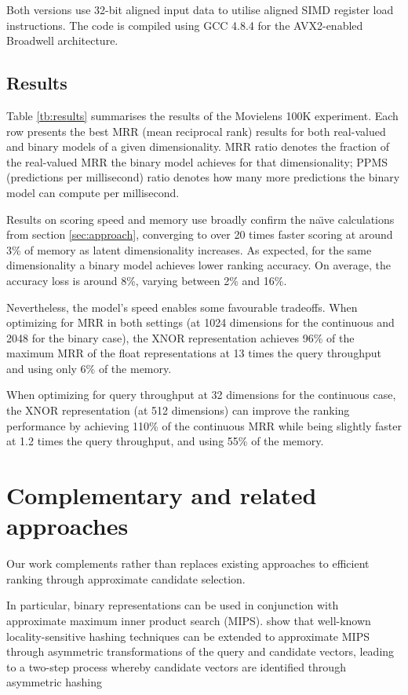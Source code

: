 \documentclass[sigchi]{acmart}
\begin{document}
Both versions use 32-bit aligned input data to utilise aligned SIMD register load instructions. The code is compiled using GCC 4.8.4 for the AVX2-enabled Broadwell architecture.

\subsection{Results}
\label{sec:results}
Table \ref{tb:results} summarises the results of the Movielens 100K experiment. Each row presents the best MRR (mean reciprocal rank) results for both real-valued and binary models of a given dimensionality. MRR ratio denotes the fraction of the real-valued MRR the binary model achieves for that dimensionality; PPMS (predictions per millisecond) ratio denotes how many more predictions the binary model can compute per millisecond.

Results on scoring speed and memory use broadly confirm the na{\"\i}ve calculations from section \ref{sec:approach}, converging to over 20 times faster scoring at around 3\% of memory as latent dimensionality increases.
As expected, for the same dimensionality a binary model achieves lower ranking accuracy. On average, the accuracy loss is around 8\%, varying between 2\% and 16\%.

Nevertheless, the model's speed enables some favourable tradeoffs. When optimizing for MRR in both settings (at 1024 dimensions for the continuous and 2048 for the binary case), the XNOR representation achieves 96\% of the maximum MRR of the float representations at 13 times the query throughput and using only 6\% of the memory.

When optimizing for query throughput at 32 dimensions for the continuous case, the XNOR representation (at 512 dimensions) can improve the ranking performance by achieving 110\% of the continuous MRR while being slightly faster at 1.2 times the query throughput, and using 55\% of the memory.

\section{Complementary and related approaches}
Our work complements rather than replaces existing approaches to efficient ranking through approximate candidate selection.

In particular, binary representations can be used in conjunction with approximate maximum inner product search (MIPS). \cite{shrivastava2014asymmetric} show that well-known locality-sensitive hashing techniques \citep{indyk1998approximate} can be extended to approximate MIPS through asymmetric transformations of the query and candidate vectors, leading to a two-step process whereby candidate vectors are identified through asymmetric hashing
\end{document}
